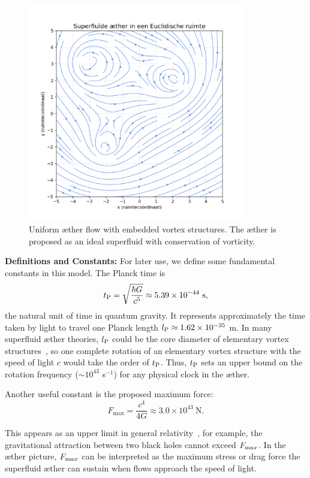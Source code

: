 \begin{figure}[htbp]
    \centering
    \includegraphics[width=0.85\textwidth]{../04-ÆtherSuperfluïde}
    \caption{Uniform æther flow with embedded vortex structures. The æther is proposed as an ideal superfluid with conservation of vorticity.}
    \label{fig:ÆtherSuperfluïde}
\end{figure}


\textbf{Definitions and Constants:} For later use, we define some fundamental constants in this model. The Planck time is
\[
    t_{\textrm P} = \sqrt{\frac{\hbar G}{c^5}} \approx 5.39\times10^{-44}\ \text{s},
\]
the natural unit of time in quantum gravity. It represents approximately the time taken by light to travel one Planck length $l_{\textrm P} \approx 1.62\times10^{-35}$ m. In many superfluid æther theories, $l_{\textrm P}$ could be the core diameter of elementary vortex structures~\cite{Winterberg2002-PlanckAether}, so one complete rotation of an elementary vortex structure with the speed of light $c$ would take the order of $t_{\textrm P}$. Thus, $t_{\textrm P}$ sets an upper bound on the rotation frequency ($\sim 10^{43}$ s$^{-1}$) for any physical clock in the æther.

Another useful constant is the proposed maximum force:
\begin{equation*}
    F_\text{max} = \frac{c^4}{4G} \approx 3.0\times10^{43}\ \text{N}.
\end{equation*}

This appears as an upper limit in general relativity~\cite{Schiller2022-maxforce}, for example, the gravitational attraction between two black holes cannot exceed $F_{\textrm max}$. In the æther picture, $F_{\textrm max}$ can be interpreted as the maximum stress or drag force the superfluid æther can sustain when flows approach the speed of light.

